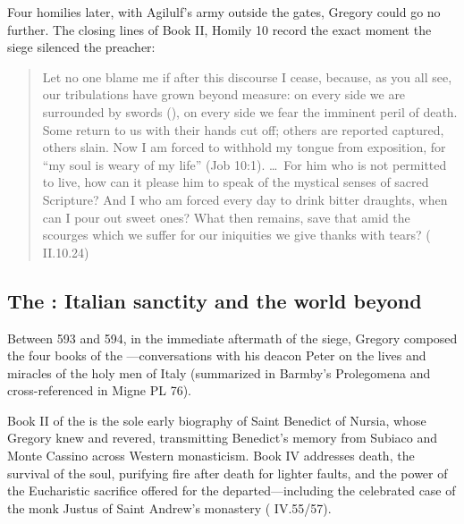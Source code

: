 Four homilies later, with Agilulf's army outside the gates, Gregory could go
no further. The closing lines of Book II, Homily 10 record the exact moment
the siege silenced the preacher:

\begin{quote}
Let no one blame me if after this discourse I cease, because, as you all see,
our tribulations have grown beyond measure: on every side we are surrounded by
swords (), on every side we fear the
imminent peril of death. Some return to us with their hands cut off; others are
reported captured, others slain. Now I am forced to withhold my tongue from
exposition, for ``my soul is weary of my life'' (Job 10:1). \dots\ For him who
is not permitted to live, how can it please him to speak of the mystical senses
of sacred Scripture? And I who am forced every day to drink bitter draughts,
when can I pour out sweet ones? What then remains, save that amid the scourges
which we suffer for our iniquities we give thanks with tears? ( II.10.24)
\end{quote}

\subsection{The : Italian sanctity and the world beyond}

Between 593 and 594, in the immediate aftermath of the siege, Gregory composed
the four books of the ---conversations with his deacon Peter on
the lives and miracles of the holy men of Italy (summarized in Barmby's
Prolegomena and cross-referenced in Migne PL 76).

Book II of the  is the sole early biography of Saint Benedict of
Nursia, whose  Gregory knew and revered, transmitting
Benedict's memory from Subiaco and Monte Cassino across Western monasticism.
Book IV addresses death, the survival of the soul, purifying fire after death
for lighter faults, and the power of the Eucharistic sacrifice offered for the
departed---including the celebrated case of the monk Justus of Saint Andrew's
monastery ( IV.55/57).

